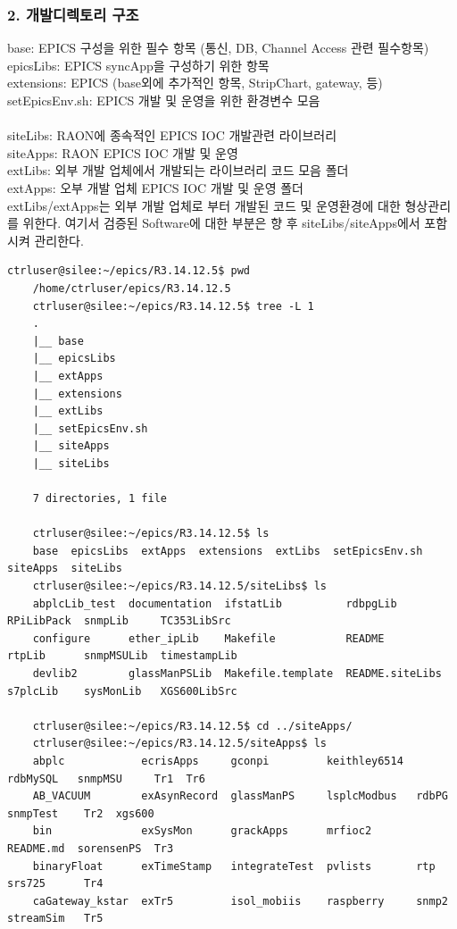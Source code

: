 \documentclass[11pt
  , a4paper
  , article
  , oneside
]{memoir}
\begin{document}
	\subsubsection {2. 개발디렉토리 구조}
	base: EPICS 구성을 위한 필수 항목 (통신, DB, Channel Access 관련 필수항목)\\
	epicsLibs: EPICS syncApp을 구성하기 위한 항목 \\
	extensions: EPICS (base외에 추가적인 항목, StripChart, gateway, 등) \\
	setEpicsEnv.sh: EPICS 개발 및 운영을 위한 환경변수 모음 \\
	\\
	siteLibs: RAON에 종속적인 EPICS IOC 개발관련 라이브러리 \\
	siteApps: RAON EPICS IOC 개발 및 운영 \\
	extLibs: 외부 개발 업체에서 개발되는 라이브러리 코드 모음 폴더 \\
	extApps: 오부 개발 업체 EPICS IOC 개발 및 운영 폴더 \\
	
	extLibs/extApps는 외부 개발 업체로 부터 개발된 코드 및 운영환경에 대한 형상관리를 위한다. 여기서 검증된 Software에 대한 부분은 향 후 siteLibs/siteApps에서 포함 시켜 관리한다.
	
	\begin{lstlisting}[style=termstyle, escapechar=!]
	ctrluser@silee:~/epics/R3.14.12.5$ pwd
	/home/ctrluser/epics/R3.14.12.5
	ctrluser@silee:~/epics/R3.14.12.5$ tree -L 1
	.
	|__ base
	|__ epicsLibs
	|__ extApps
	|__ extensions
	|__ extLibs
	|__ setEpicsEnv.sh
	|__ siteApps
	|__ siteLibs
	
	7 directories, 1 file
	
	ctrluser@silee:~/epics/R3.14.12.5$ ls
	base  epicsLibs  extApps  extensions  extLibs  setEpicsEnv.sh  siteApps  siteLibs
	ctrluser@silee:~/epics/R3.14.12.5/siteLibs$ ls
	abplcLib_test  documentation  ifstatLib          rdbpgLib         RPiLibPack  snmpLib     TC353LibSrc
	configure      ether_ipLib    Makefile           README           rtpLib      snmpMSULib  timestampLib
	devlib2        glassManPSLib  Makefile.template  README.siteLibs  s7plcLib    sysMonLib   XGS600LibSrc
	
	ctrluser@silee:~/epics/R3.14.12.5$ cd ../siteApps/
	ctrluser@silee:~/epics/R3.14.12.5/siteApps$ ls
	abplc            ecrisApps     gconpi         keithley6514  rdbMySQL   snmpMSU     Tr1  Tr6
	AB_VACUUM        exAsynRecord  glassManPS     lsplcModbus   rdbPG      snmpTest    Tr2  xgs600
	bin              exSysMon      grackApps      mrfioc2       README.md  sorensenPS  Tr3
	binaryFloat      exTimeStamp   integrateTest  pvlists       rtp        srs725      Tr4
	caGateway_kstar  exTr5         isol_mobiis    raspberry     snmp2      streamSim   Tr5
	\end{lstlisting}		
	    
\end{document}

